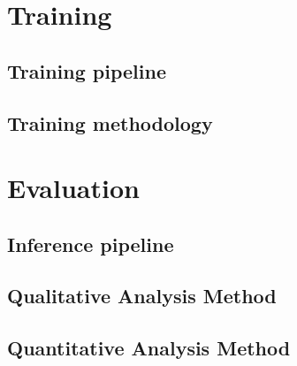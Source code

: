 \section{Training}

    \subsection{Training pipeline}

    \subsection{Training methodology}

\section{Evaluation}

    \subsection{Inference pipeline}
    
    \subsection{Qualitative Analysis Method}

    \subsection{Quantitative Analysis Method}